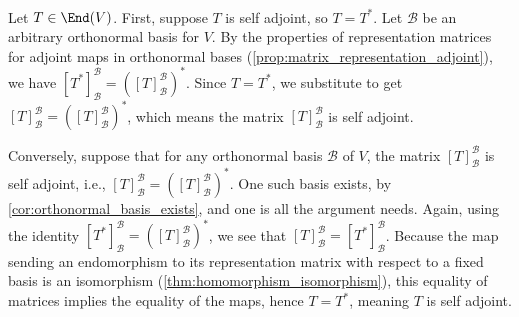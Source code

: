 \begin{exercisesolution}
\label{sol:self_adjoint_matrix_criterion} ~\\
Let $T \in \End(V)$.
First, suppose $T$ is self adjoint, so $T = T^*$. Let $\mathcal{B}$ be an arbitrary orthonormal basis for $V$. By the properties of representation matrices for adjoint maps in orthonormal bases (\cref{prop:matrix_representation_adjoint}), we have $[T^*]_{\mathcal{B}}^{\mathcal{B}} = \left([T]_{\mathcal{B}}^{\mathcal{B}}\right)^*$. Since $T = T^*$, we substitute to get $[T]_{\mathcal{B}}^{\mathcal{B}} = \left([T]_{\mathcal{B}}^{\mathcal{B}}\right)^*$, which means the matrix $[T]_{\mathcal{B}}^{\mathcal{B}}$ is self adjoint.

Conversely, suppose that for any orthonormal basis $\mathcal{B}$ of $V$, the matrix $[T]_{\mathcal{B}}^{\mathcal{B}}$ is self adjoint, i.e., $[T]_{\mathcal{B}}^{\mathcal{B}} = \left([T]_{\mathcal{B}}^{\mathcal{B}}\right)^*$. One such basis exists, by \cref{cor:orthonormal_basis_exists}, and one is all the argument needs. Again, using the identity $[T^*]_{\mathcal{B}}^{\mathcal{B}} = \left([T]_{\mathcal{B}}^{\mathcal{B}}\right)^*$, we see that $[T]_{\mathcal{B}}^{\mathcal{B}} = [T^*]_{\mathcal{B}}^{\mathcal{B}}$. Because the map sending an endomorphism to its representation matrix with respect to a fixed basis is an isomorphism (\cref{thm:homomorphism_isomorphism}), this equality of matrices implies the equality of the maps, hence $T = T^*$, meaning $T$ is self adjoint.
\end{exercisesolution}

